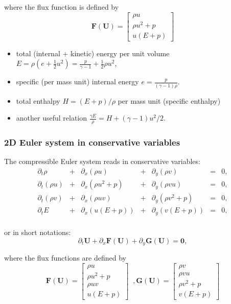 \documentclass{article}
\begin{document}
where the flux function is defined by
\begin{equation}
  \mathbf{F(U)} = \left [
  \begin{array}{c}
    \rho u \\
    \rho u^2 + p \\
    u (E + p)
  \end{array} \right]
\end{equation}

\begin{itemize}
\item total (internal + kinetic) energy per unit volume $E = \rho \left( e + \frac{1}{2} u^2 \right) = \frac{p}{\gamma-1} + \frac{1}{2} \rho u^2$,
\item specific (per mass unit) internal energy $e=\frac{p}{(\gamma-1)\rho}$.
\item total enthalpy $H = (E + p)/\rho$ per mass unit (specific enthalpy)
\item another useful relation $\frac{\gamma E}{\rho}=H+(\gamma-1)u^2/2$.
\end{itemize}


\subsubsection*{2D Euler system in conservative variables}
The compressible Euler system reads in conservative variables:\\
\begin{equation}
  \begin{array}{ccccccc}
    \partial_t \rho & + & \partial_x(\rho u) & + & \partial_y(\rho v) & = & 0,\\
    \partial_t (\rho u) & + & \partial_x(\rho u^2+p) & + & \partial_y(\rho v u) & = & 0,\\
    \partial_t (\rho v) & + & \partial_x(\rho u v) & + & \partial_y(\rho v^2+p) & = & 0,\\
    \partial_t E & + & \partial_x (u(E+p)) & + & \partial_y (v(E+p)) & = & 0,\\
  \end{array}
\end{equation}

or in short notations:
\begin{equation*}
  \partial_t \mathbf{U} + \partial_x \mathbf{F(U)} + \partial_y \mathbf{G(U)} = \mathbf{0},
\end{equation*}

where the flux functions are defined by
\begin{equation}
  \mathbf{F(U)} = \left [
  \begin{array}{c}
    \rho u \\
    \rho u^2 + p \\
    \rho u v \\
    u (E + p)
  \end{array} \right]
  \;\; ,
  \mathbf{G(U)} = \left [
  \begin{array}{c}
    \rho v \\
    \rho v u \\
    \rho v^2 + p \\
    v (E + p)
  \end{array} \right]
\end{equation}
\end{document}
